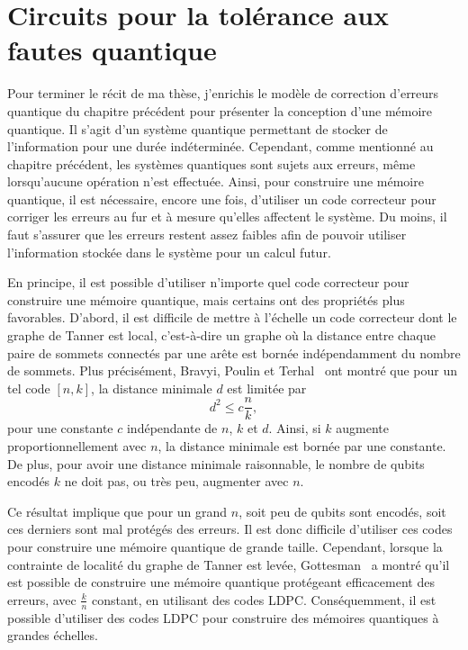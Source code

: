 \begin{comment}
\end{comment}

\chapter{Circuits pour la tolérance aux fautes quantique}

Pour terminer le récit de ma thèse,
j'enrichis le modèle de correction d'erreurs quantique
du chapitre précédent pour présenter la conception d'une mémoire quantique.
Il s'agit d'un système quantique permettant de stocker
de l'information pour une durée indéterminée.
Cependant,
comme mentionné au chapitre précédent,
les systèmes quantiques sont sujets aux erreurs,
même lorsqu'aucune opération n'est effectuée.
Ainsi,
pour construire une mémoire quantique,
il est nécessaire, encore une fois,
d'utiliser un code correcteur pour corriger les erreurs au fur et à mesure
qu'elles affectent le système.
Du moins,
il faut s'assurer que les erreurs restent assez faibles afin de pouvoir utiliser
l'information stockée dans le système pour un calcul futur.

En principe,
il est possible d'utiliser n'importe quel code correcteur pour construire
une mémoire quantique,
mais certains ont des propriétés plus favorables.
D'abord,
il est difficile de mettre à l'échelle un code correcteur dont le graphe
de Tanner est local, c'est-à-dire un graphe où la distance entre chaque paire de sommets 
connectés par une arête est bornée indépendamment du nombre de sommets.
Plus précisément,
Bravyi, Poulin et Terhal~\cite{bravyi_tradeoffs_2010}
ont montré que pour un tel code $[n, k]$,
la distance minimale $d$ est limitée par
\begin{equation}
	d^2 \leq c \frac{n}{k},
\end{equation}
pour une constante $c$ indépendante de $n$, $k$ et $d$.
Ainsi,
si $k$ augmente proportionnellement avec $n$,
la distance minimale est bornée par une constante.
De plus,
pour avoir une distance minimale raisonnable,
le nombre de qubits encodés $k$ 
ne doit pas, ou très peu, augmenter avec $n$.

Ce résultat implique que pour un grand $n$,
soit peu de qubits sont encodés,
soit ces derniers sont mal protégés des erreurs.
Il est donc difficile d'utiliser ces codes pour construire une mémoire 
quantique de grande taille.
Cependant,
lorsque la contrainte de localité du graphe de Tanner est levée,
Gottesman~\cite{gottesman_fault-tolerant_2013} a montré qu'il est possible 
de construire une mémoire quantique protégeant efficacement des erreurs,
avec $\frac{k}{n}$ constant, en utilisant des codes LDPC.
Conséquemment,
il est possible d'utiliser des codes LDPC pour construire 
des mémoires quantiques à grandes échelles.


